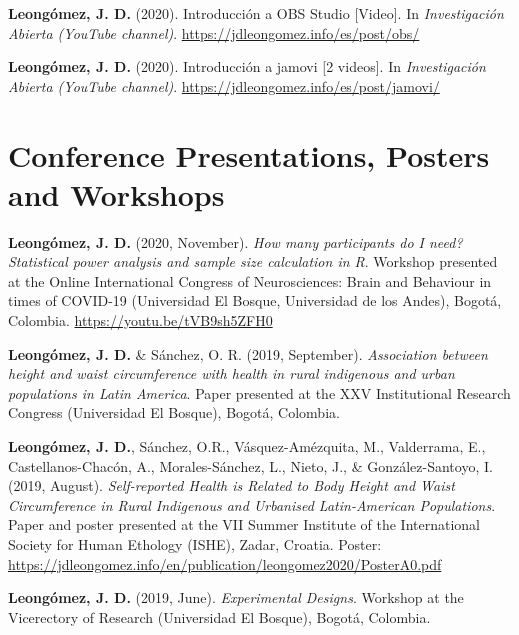 \documentclass[11pt, a4paper]{awesome-cv}
\begin{document}
\leavevmode\hypertarget{ref-leongomezIntroduccionOBSStudio2020}{}%
\textbf{Leongómez, J. D.} (2020). {Introducción a OBS Studio
{[}Video{]}}. In \emph{{Investigación Abierta (YouTube channel)}}.
\url{https://jdleongomez.info/es/post/obs/}

\leavevmode\hypertarget{ref-leongomezIntroduccionJamovi2020}{}%
\textbf{Leongómez, J. D.} (2020). {Introducción a jamovi {[}2
videos{]}}. In \emph{{Investigación Abierta (YouTube channel)}}.
\url{https://jdleongomez.info/es/post/jamovi/}

\endgroup

\hypertarget{conference-presentations-posters-and-workshops}{%
\section{Conference Presentations, Posters and
Workshops}\label{conference-presentations-posters-and-workshops}}

\begingroup
\setlength{\parindent}{-0.5in}
\setlength{\leftskip}{0.5in}

\textbf{Leongómez, J. D.} (2020, November). \emph{How many participants
do I need? Statistical power analysis and sample size calculation in R}.
Workshop presented at the Online International Congress of
Neurosciences: Brain and Behaviour in times of COVID-19 (Universidad El
Bosque, Universidad de los Andes), Bogotá, Colombia.
\url{https://youtu.be/tVB9sh5ZFH0}

\textbf{Leongómez, J. D.} \& Sánchez, O. R. (2019, September).
\emph{Association between height and waist circumference with health in
rural indigenous and urban populations in Latin America}. Paper
presented at the XXV Institutional Research Congress (Universidad El
Bosque), Bogotá, Colombia.

\textbf{Leongómez, J. D.}, Sánchez, O.R., Vásquez-Amézquita, M.,
Valderrama, E., Castellanos-Chacón, A., Morales-Sánchez, L., Nieto, J.,
\& González-Santoyo, I. (2019, August). \emph{Self-reported Health is
Related to Body Height and Waist Circumference in Rural Indigenous and
Urbanised Latin-American Populations}. Paper and poster presented at the
VII Summer Institute of the International Society for Human Ethology
(ISHE), Zadar, Croatia. Poster:
\url{https://jdleongomez.info/en/publication/leongomez2020/PosterA0.pdf}

\textbf{Leongómez, J. D.} (2019, June). \emph{Experimental Designs}.
Workshop at the Vicerectory of Research (Universidad El Bosque), Bogotá,
Colombia.
\end{document}
